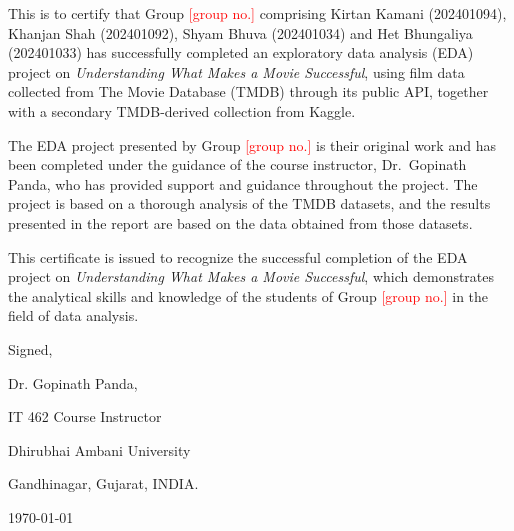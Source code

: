 \documentclass[a4paper,12pt]{report}
\newcommand{\groupno}{\textcolor{red}{[group no.]}}
\begin{document}
This is to certify that Group \groupno{} comprising Kirtan Kamani (202401094), Khanjan Shah (202401092), Shyam Bhuva (202401034) and Het Bhungaliya (202401033) has successfully completed an exploratory data analysis (EDA) project on \emph{Understanding What Makes a Movie Successful}, using film data collected from The Movie Database (TMDB) through its public API, together with a secondary TMDB-derived collection from Kaggle.

The EDA project presented by Group \groupno{} is their original work and has been completed under the guidance of the course instructor, Dr.\ Gopinath Panda, who has provided support and guidance throughout the project. The project is based on a thorough analysis of the TMDB datasets, and the results presented in the report are based on the data obtained from those datasets.

This certificate is issued to recognize the successful completion of the EDA project on \emph{Understanding What Makes a Movie Successful}, which demonstrates the analytical skills and knowledge of the students of Group \groupno{} in the field of data analysis.


\vfill
Signed,\par
Dr. Gopinath Panda,\par
IT 462 Course Instructor\par
Dhirubhai Ambani University\par
Gandhinagar, Gujarat, INDIA.\par

\today
\end{document}
